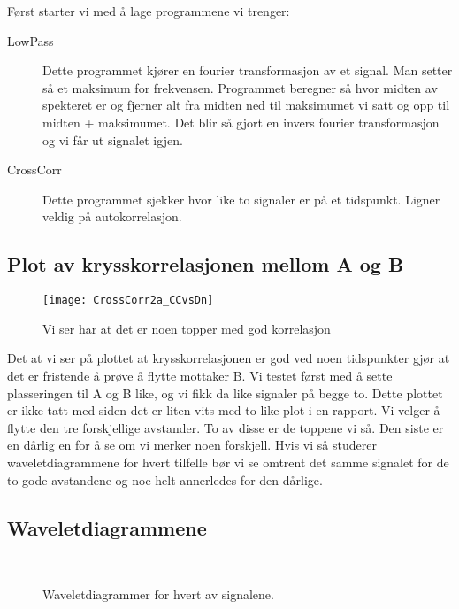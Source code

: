 \documentclass[12pt,norsk,a4paper]{article}
\begin{document}
Først starter vi med å lage programmene vi trenger:
\begin{description}
\item[LowPass] Dette programmet kjører en fourier transformasjon av et signal. Man setter så et maksimum for frekvensen. Programmet beregner så hvor midten av spekteret er og fjerner alt fra midten ned til maksimumet vi satt og opp til midten + maksimumet. Det blir så gjort en invers fourier transformasjon og vi får ut signalet igjen.
\item[CrossCorr] Dette programmet sjekker hvor like to signaler er på et tidspunkt. Ligner veldig på autokorrelasjon.
\end{description}


\subsection{Plot av krysskorrelasjonen mellom A og B}

\begin{figure}[H]
\texttt{[image: CrossCorr2a\_CCvsDn]}\\
\caption{Vi ser har at det er noen topper med god korrelasjon}
\end{figure}

Det at vi ser på plottet at krysskorrelasjonen er god ved noen tidspunkter gjør at det er fristende å prøve å flytte mottaker B. 
Vi testet først med å sette plasseringen til A og B like, og vi fikk da like signaler på begge to. Dette plottet er ikke tatt med siden det er liten vits med to like plot i en rapport.
Vi velger å flytte den tre forskjellige avstander. 
To av disse er de toppene vi så. 
Den siste er en dårlig en for å se om vi merker noen forskjell. 
Hvis vi så studerer waveletdiagrammene for hvert tilfelle bør vi se omtrent det samme signalet for de to gode avstandene og noe helt annerledes for den dårlige.

\subsection{Waveletdiagrammene}

\begin{figure}[H]
\begin{center}
\\ 
\noindent 
{}
\end{center}
\caption[caption]{Waveletdiagrammer for hvert av signalene.} 
\end{figure}
\end{document}

